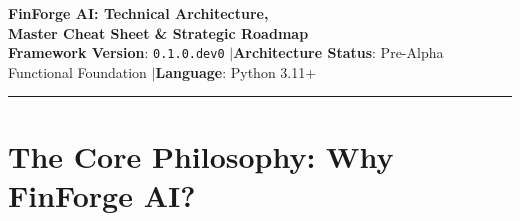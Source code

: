 \documentclass[11pt,a4paper]{article}
\begin{document}
\begin{center}
    {\fontsize{24pt}{28pt}\selectfont \textbf{\color{brandnavy}FinForge AI: Technical Architecture,}}\\[4pt]
    {\fontsize{18pt}{22pt}\selectfont \textbf{\color{brandblue}Master Cheat Sheet \& Strategic Roadmap}}\\[10pt]
    {\normalsize \textbf{Framework Version}: \texttt{0.1.0.dev0} \quad$|$\quad \textbf{Architecture Status}: Pre-Alpha Functional Foundation \quad$|$\quad \textbf{Language}: Python 3.11+}\\[6pt]
    \rule{\textwidth}{1.2pt}
\end{center}

\vspace{-6pt}
\begin{abstract}
\noindent \textbf{Executive Summary} --- Contemporary Artificial Intelligence and Machine Learning framework design is plagued by three fundamental engineering bottlenecks: \textit{opaque algorithmic black-boxes}, \textit{transitive dependency bloat}, and \textit{contract fragmentation}. \textbf{FinForge AI} is an open-source, general-purpose, modular AI framework architected around a strict \textbf{scratch-first} paradigm. By establishing standardized lifecycle state machines, zero-execution declarative manifests (\texttt{component.yaml}), static contract type verification, and directed acyclic graph (DAG) pipeline orchestration, FinForge AI enables practitioners, researchers, and financial engineers to implement algorithms from first principles and compose them into robust, reproducible, and verifiable production workflows. This document serves as the comprehensive architectural reference, implementation cheat sheet, and engineering roadmap for the FinForge AI framework.
\end{abstract}

\vspace{4pt}

\section{The Core Philosophy: Why FinForge AI?}
\end{document}
